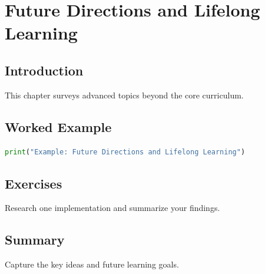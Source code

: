 \chapter{Future Directions and Lifelong Learning}
\label{chap:vol13-5}



\section{Introduction}
This chapter surveys advanced topics beyond the core curriculum.

\section{Worked Example}
\begin{lstlisting}[language=Python]
print("Example: Future Directions and Lifelong Learning")
\end{lstlisting}

\section{Exercises}
\begin{exercise}
Research one implementation and summarize your findings.
\end{exercise}

\section{Summary}
Capture the key ideas and future learning goals.
